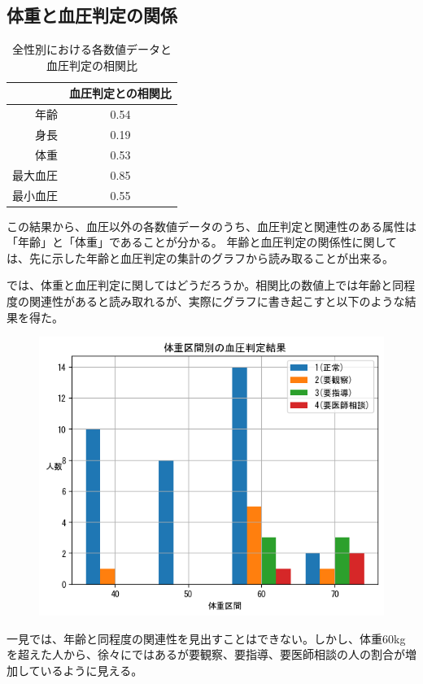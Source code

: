 \documentclass[dvipdfmx]{jsarticle}
\begin{document}
    \subsection{体重と血圧判定の関係}
    \begin{table}[H]
        \centering
        \begin{tabular}{r|c}
            & 血圧判定との相関比 \\ \hline
        年齢   & 0.54 \\
        身長   & 0.19 \\
        体重   & 0.53 \\
        最大血圧 & 0.85 \\
        最小血圧 & 0.55
        \end{tabular}
        \caption{全性別における各数値データと血圧判定の相関比}
    \end{table}
    この結果から、血圧以外の各数値データのうち、血圧判定と関連性のある属性は「年齢」と「体重」であることが分かる。
    年齢と血圧判定の関係性に関しては、先に示した年齢と血圧判定の集計のグラフから読み取ることが出来る。\par
        では、体重と血圧判定に関してはどうだろうか。相関比の数値上では年齢と同程度の関連性があると読み取れるが、実際にグラフに書き起こすと以下のような結果を得た。
        \begin{figure}[H]
            \centering
            \includegraphics[scale=0.7]{images/allgender/weight_bldPrs_result.png}
        \end{figure}
        一見では、年齢と同程度の関連性を見出すことはできない。しかし、体重60kgを超えた人から、徐々にではあるが要観察、要指導、要医師相談の人の割合が増加しているように見える。
\end{document}
